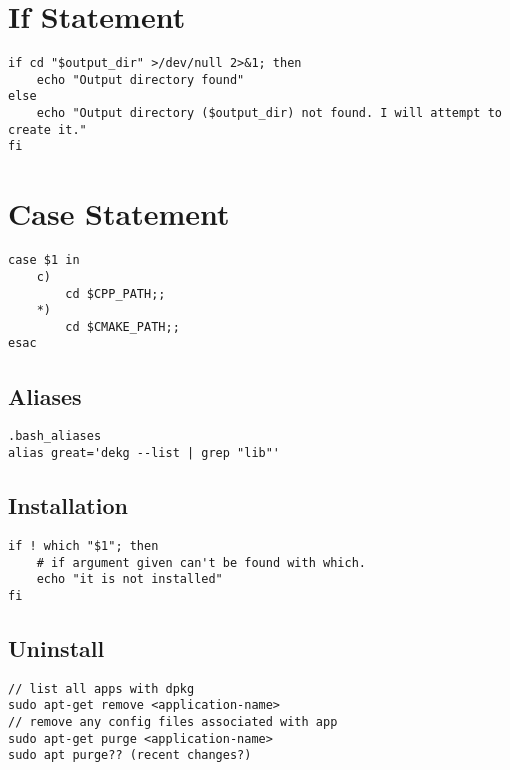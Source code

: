 \section{If Statement}

\begin{verbatim}
if cd "$output_dir" >/dev/null 2>&1; then
    echo "Output directory found"
else
    echo "Output directory ($output_dir) not found. I will attempt to create it."
fi
\end{verbatim}

\section{Case Statement}

\begin{verbatim}
case $1 in
    c)
        cd $CPP_PATH;;
    *)
        cd $CMAKE_PATH;;
esac
\end{verbatim}

\subsection{Aliases}

\begin{verbatim}
.bash_aliases
alias great='dekg --list | grep "lib"'
\end{verbatim}

\subsection{Installation}

\begin{verbatim}
if ! which "$1"; then
    # if argument given can't be found with which. 
    echo "it is not installed"
fi
\end{verbatim}

\subsection{Uninstall}

\begin{verbatim}
// list all apps with dpkg
sudo apt-get remove <application-name>
// remove any config files associated with app
sudo apt-get purge <application-name>
sudo apt purge?? (recent changes?) 
\end{verbatim}

